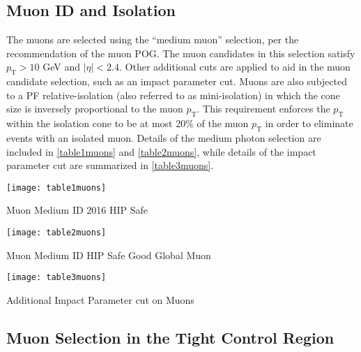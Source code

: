 \subsection{Muon ID and Isolation}

The muons are selected using the ``medium muon'' selection\cite{muonID}, per the recommendation of the muon POG. The muon candidates in this selection satisfy $p_\text{T} > 10$ GeV and $|\eta| < 2.4$. Other additional cuts are applied to aid in the muon candidate selection, such as an impact parameter cut. Muons are also subjected to a PF relative-isolation (also referred to as mini-isolation) in which the cone size is inversely proportional to the muon $p_\text{T}$. This requirement enforces the $p_\text{T}$ within the isolation cone to be at most 20\% of the muon $p_\text{T}$ in order to eliminate events with an isolated muon. Details of the medium photon selection are included in \autoref{table1muons} and \autoref{table2muons}, while details of the impact parameter cut are summarized in \autoref{table3muons}.

\begin{table}[H]
\begin{center}
\texttt{[image: table1muons]}
\caption{Muon Medium ID 2016 HIP Safe}
\label{table1muons}
\end{center}
\end{table}

\begin{table}[H]
\begin{center}
\texttt{[image: table2muons]}
\caption{Muon Medium ID HIP Safe Good Global Muon}
\label{table2muons}
\end{center}
\end{table}

\begin{table}[H]
\begin{center}
\texttt{[image: table3muons]}
\caption{Additional Impact Parameter cut on Muons}
\label{table3muons}
\end{center}
\end{table}

\subsection{Muon Selection in the Tight Control Region}\label{tightmumu}

